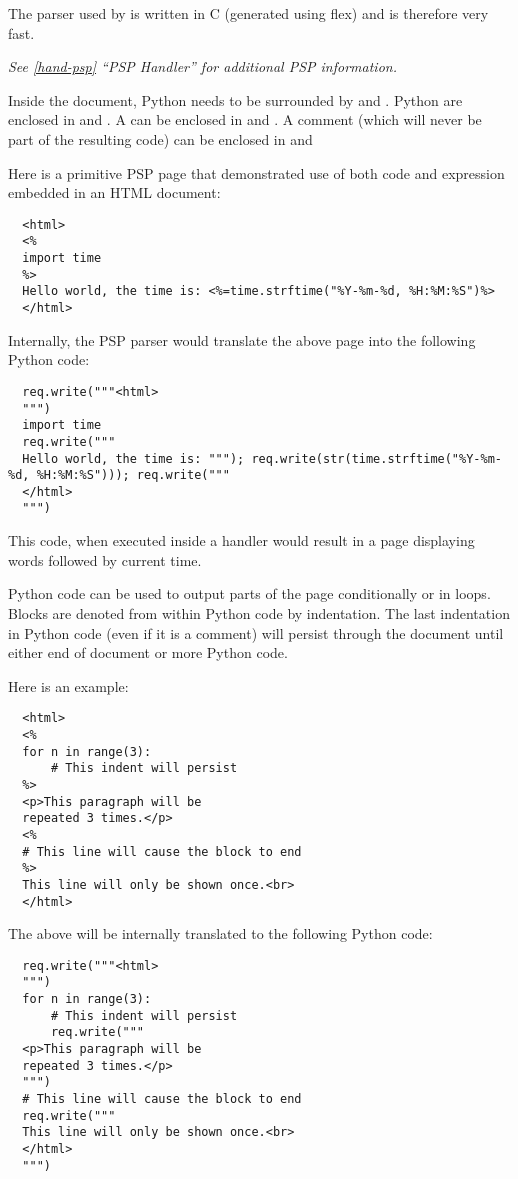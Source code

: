 The parser used by  is written in C (generated using flex)
and is therefore very fast.

\emph{See \ref{hand-psp} ``PSP Handler'' for additional PSP
information.}

Inside the document, Python  needs to be surrounded by
\samp{<\%} and \samp{\%>}. Python  are enclosed in
\samp{<\%=} and \samp{\%>}. A  can be enclosed in
 and \samp{\%>}. A comment (which will never be part of
the resulting code) can be enclosed in \samp{<\%--} and \samp{--\%>}

Here is a primitive PSP page that demonstrated use of both code and
expression embedded in an HTML document:

\begin{verbatim}
  <html>
  <%
  import time
  %>
  Hello world, the time is: <%=time.strftime("%Y-%m-%d, %H:%M:%S")%>
  </html>
\end{verbatim}

Internally, the PSP parser would translate the above page into the
following Python code:

\begin{verbatim}
  req.write("""<html>
  """)
  import time
  req.write("""
  Hello world, the time is: """); req.write(str(time.strftime("%Y-%m-%d, %H:%M:%S"))); req.write("""
  </html>
  """)
\end{verbatim}

This code, when executed inside a handler would result in a page
displaying words  followed by current time.

Python code can be used to output parts of the page conditionally or
in loops. Blocks are denoted from within Python code by
indentation. The last indentation in Python code (even if it is a
comment) will persist through the document until either end of
document or more Python code.

Here is an example:
\begin{verbatim}
  <html>
  <%
  for n in range(3):
      # This indent will persist
  %>
  <p>This paragraph will be 
  repeated 3 times.</p>
  <%
  # This line will cause the block to end
  %>
  This line will only be shown once.<br>
  </html>
\end{verbatim}

The above will be internally translated to the following Python code:

\begin{verbatim}
  req.write("""<html>
  """)
  for n in range(3):
      # This indent will persist
      req.write("""
  <p>This paragraph will be
  repeated 3 times.</p>
  """)
  # This line will cause the block to end
  req.write("""
  This line will only be shown once.<br>
  </html>
  """)
\end{verbatim}

